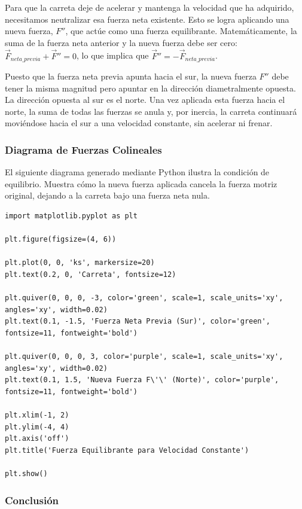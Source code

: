 \documentclass[12pt, a4paper]{article}
\begin{document}
Para que la carreta deje de acelerar y mantenga la velocidad que ha adquirido, necesitamos neutralizar esa fuerza neta existente. Esto se logra aplicando una nueva fuerza, $F''$, que actúe como una fuerza equilibrante. Matemáticamente, la suma de la fuerza neta anterior y la nueva fuerza debe ser cero: $\vec{F}_{neta\_previa} + \vec{F}'' = 0$, lo que implica que $\vec{F}'' = -\vec{F}_{neta\_previa}$.

Puesto que la fuerza neta previa apunta hacia el sur, la nueva fuerza $F''$ debe tener la misma magnitud pero apuntar en la dirección diametralmente opuesta. La dirección opuesta al sur es el norte. Una vez aplicada esta fuerza hacia el norte, la suma de todas las fuerzas se anula y, por inercia, la carreta continuará moviéndose hacia el sur a una velocidad constante, sin acelerar ni frenar.

\subsubsection*{Diagrama de Fuerzas Colineales}

El siguiente diagrama generado mediante Python ilustra la condición de equilibrio. Muestra cómo la nueva fuerza aplicada cancela la fuerza motriz original, dejando a la carreta bajo una fuerza neta nula.

\begin{lstlisting}
import matplotlib.pyplot as plt

plt.figure(figsize=(4, 6))

plt.plot(0, 0, 'ks', markersize=20)
plt.text(0.2, 0, 'Carreta', fontsize=12)

plt.quiver(0, 0, 0, -3, color='green', scale=1, scale_units='xy', angles='xy', width=0.02)
plt.text(0.1, -1.5, 'Fuerza Neta Previa (Sur)', color='green', fontsize=11, fontweight='bold')

plt.quiver(0, 0, 0, 3, color='purple', scale=1, scale_units='xy', angles='xy', width=0.02)
plt.text(0.1, 1.5, 'Nueva Fuerza F\'\' (Norte)', color='purple', fontsize=11, fontweight='bold')

plt.xlim(-1, 2)
plt.ylim(-4, 4)
plt.axis('off')
plt.title('Fuerza Equilibrante para Velocidad Constante')

plt.show()
\end{lstlisting}

\subsubsection*{Conclusión}
\end{document}
